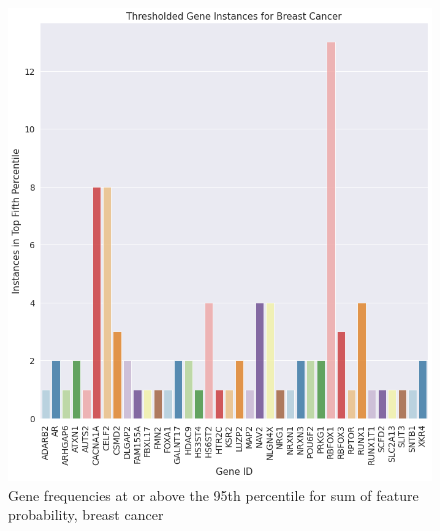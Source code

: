 \documentclass{article}
\begin{document}
\begin{figure}[h!]
    \centering
    \includegraphics[scale=0.5]{figures/breast.png}
    \caption{Gene frequencies at or above the 95th percentile  for sum of feature probability, breast cancer}
    \label{fig:my_label}
\end{figure}
\end{document}
